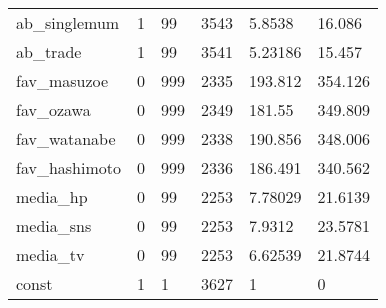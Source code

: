 \begin{tabular}{llllll}
ab\_singlemum  &        1 &         99 &  3543 &    5.8538 &    16.086 \\
ab\_trade      &        1 &         99 &  3541 &   5.23186 &    15.457 \\
fav\_masuzoe   &        0 &        999 &  2335 &   193.812 &   354.126 \\
fav\_ozawa     &        0 &        999 &  2349 &    181.55 &   349.809 \\
fav\_watanabe  &        0 &        999 &  2338 &   190.856 &   348.006 \\
fav\_hashimoto &        0 &        999 &  2336 &   186.491 &   340.562 \\
media\_hp      &        0 &         99 &  2253 &   7.78029 &   21.6139 \\
media\_sns     &        0 &         99 &  2253 &    7.9312 &   23.5781 \\
media\_tv      &        0 &         99 &  2253 &   6.62539 &   21.8744 \\
const         &        1 &          1 &  3627 &         1 &         0 \\
\bottomrule
\end{tabular}
